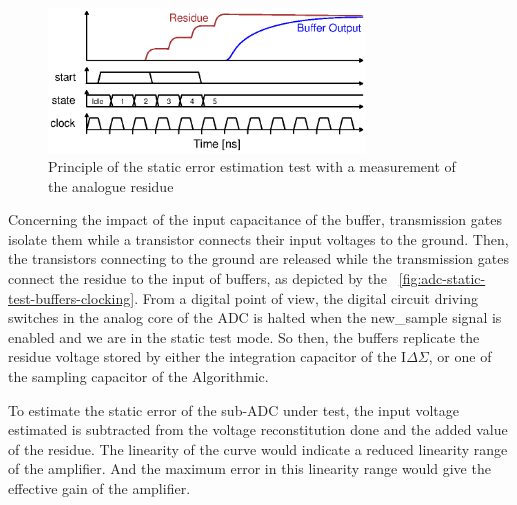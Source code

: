 \begin{figure}[htp]
    \centering
    \includegraphics[width=0.75\textwidth]{Chapter5/Figs/adc_chip/static-test-principle.ps}
    \caption{Principle of the static error estimation test with a measurement of the analogue residue}
    \label{fig:adc-static-test}
\end{figure}

Concerning the impact of the input capacitance of the buffer, transmission gates isolate them while a transistor connects their input voltages to the ground. Then, the transistors connecting to the ground are released while the transmission gates connect the residue to the input of buffers, as depicted by the \figurename~\ref{fig:adc-static-test-buffers-clocking}. From a digital point of view, the digital circuit driving switches in the analog core of the ADC is halted when the new\_sample signal is enabled and we are in the static test mode. So then, the buffers replicate the residue voltage stored by either the integration capacitor of the I\(\Delta \Sigma\), or one of the sampling capacitor of the Algorithmic.

To estimate the static error of the sub-ADC under test, the input voltage estimated is subtracted from the voltage reconstitution done and the added value of the residue. The linearity of the curve would indicate a reduced linearity range of the amplifier. And the maximum error in this linearity range would give the effective gain of the amplifier.

